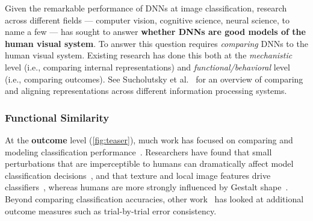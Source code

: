 \documentclass[sigconf]{acmart}
\begin{document}
Given the remarkable performance of DNNs at image classification, research across different fields --- computer vision, cognitive science, neural science, to name a few ---  has sought to answer \textbf{whether DNNs are good models of the human visual system}. To answer this question requires \textit{comparing} DNNs to the human visual system. Existing research has done this both at the \textit{mechanistic} level (i.e., comparing internal representations) and \textit{functional/behavioral} level (i.e., comparing outcomes). See Sucholutsky et al.~\cite{sucholutsky2023getting} for an overview of comparing and aligning representations across different information processing systems.

\subsubsection{Functional Similarity}

At the \textbf{outcome} level (\cref{fig:teaser}), much work has focused on comparing and modeling classification performance~\cite{roads2021enriching}. Researchers have found that small perturbations that are imperceptible to humans can dramatically affect model classification decisions~\cite{goodfellow2014explaining}, and that texture and local image features drive classifiers~\cite{baker2018deep, geirhos2018imagenet}, whereas humans are more strongly influenced by Gestalt shape~\cite{attarian2020transforming}. Beyond comparing classification accuracies, other work~\cite{geirhosAccuracyQuantifyingTrialbytrial2020} has looked at additional outcome measures such as trial-by-trial error consistency.
\end{document}
